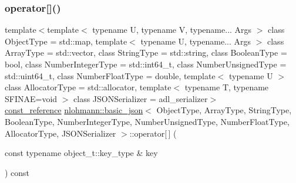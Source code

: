 \mbox{\label{classnlohmann_1_1basic__json_ab2318780e5ae692039e816b6ac32c91e}} 
\subsubsection{\texorpdfstring{operator[]()}{operator[]()}\hspace{0.1cm}{\footnotesize\ttfamily [4/10]}}
{\footnotesize\ttfamily template$<$template$<$ typename U, typename V, typename... Args $>$ class Object\+Type = std\+::map, template$<$ typename U, typename... Args $>$ class Array\+Type = std\+::vector, class String\+Type  = std\+::string, class Boolean\+Type  = bool, class Number\+Integer\+Type  = std\+::int64\+\_\+t, class Number\+Unsigned\+Type  = std\+::uint64\+\_\+t, class Number\+Float\+Type  = double, template$<$ typename U $>$ class Allocator\+Type = std\+::allocator, template$<$ typename T, typename S\+F\+I\+N\+A\+E=void $>$ class J\+S\+O\+N\+Serializer = adl\+\_\+serializer$>$ \\
\mbox{\hyperlink{classnlohmann_1_1basic__json_a4057c5425f4faacfe39a8046871786ca}{const\+\_\+reference}} \mbox{\hyperlink{classnlohmann_1_1basic__json}{nlohmann\+::basic\+\_\+json}}$<$ Object\+Type, Array\+Type, String\+Type, Boolean\+Type, Number\+Integer\+Type, Number\+Unsigned\+Type, Number\+Float\+Type, Allocator\+Type, J\+S\+O\+N\+Serializer $>$\+::operator\mbox{[}$\,$\mbox{]} (\begin{DoxyParamCaption}\item[{const typename object\+\_\+t\+::key\+\_\+type \&}]{key }\end{DoxyParamCaption}) const\hspace{0.3cm}{\ttfamily [inline]}}



